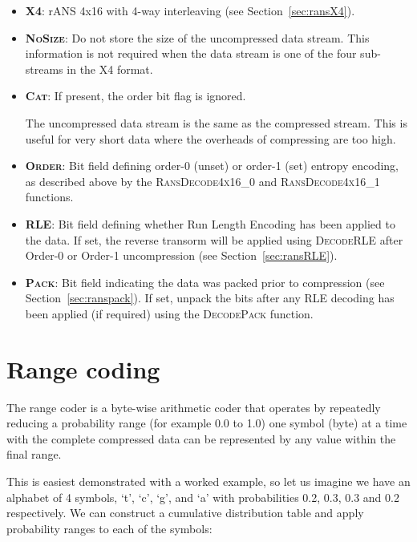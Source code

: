 \documentclass[a4paper]{article}
\begin{document}
\begin{itemize}
\item{\textbf{\textsc{X4}}:}
rANS 4x16 with 4-way interleaving (see Section~\ref{sec:ransX4}).

\item{\textbf{\textsc{NoSize}}:}
Do not store the size of the uncompressed data stream.
This information is not required when the data stream is one of the four sub-streams in the X4 format.

\item{\textbf{\textsc{Cat}}:}
If present, the order bit flag is ignored.

The uncompressed data stream is the same as the compressed stream.
This is useful for very short data where the overheads of compressing are too high.

\item{\textbf{\textsc{Order}}:}
Bit field defining order-0 (unset) or order-1 (set) entropy encoding, as described above by the \textsc{RansDecode4x16\_0} and \textsc{RansDecode4x16\_1} functions.

\item{\textbf{\textsc{RLE}}:}
Bit field defining whether Run Length Encoding has been applied to the data.  If set, the reverse transorm will be applied using \textsc{DecodeRLE} after Order-0 or Order-1 uncompression (see Section~\ref{sec:ransRLE}).

\item{\textbf{\textsc{Pack}}:}
Bit field indicating the data was packed prior to compression (see Section~\ref{sec:ranspack}).  If set, unpack the bits after any RLE decoding has been applied (if required) using the \textsc{DecodePack} function.

\end{itemize}

\section{Range coding}

The range coder is a byte-wise arithmetic coder that operates by
repeatedly reducing a probability range (for example 0.0 to 1.0) one
symbol (byte) at a time with the complete compressed data can be
represented by any value within the final range.

This is easiest demonstrated with a worked example, so let us imagine
we have an alphabet of 4 symbols, `t', `c', `g', and `a' with
probabilities 0.2, 0.3, 0.3 and 0.2 respectively.  We can construct a
cumulative distribution table and apply probability ranges to each of
the symbols:
\end{document}
